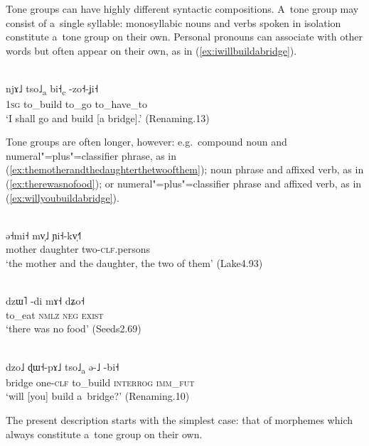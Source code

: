 Tone groups can have highly different syntactic compositions. A~tone group may consist of a~single syllable: monosyllabic nouns and verbs spoken in isolation constitute a~tone group on their own. Personal pronouns can associate with other words but often appear on their own, as in (\ref{ex:iwillbuildabridge}).

\begin{exe}
	\ex
	\label{ex:iwillbuildabridge}
	\\
	\gll njɤ˩	tso˩\textsubscript{a}	bi˧\textsubscript{c}		-zo˧-ʝi˧\\
	1\textsc{sg}	to\_build	to\_go	to\_have\_to\\
	\glt ‘I shall go and build [a bridge].’ (Renaming.13)
\end{exe}

Tone groups are often longer, however: e.g.~compound noun and numeral"=plus"=classifier phrase, as in (\ref{ex:themotherandthedaughterthetwoofthem}); noun phrase and affixed verb, as in (\ref{ex:therewasnofood}); or numeral"=plus"=classifier phrase and affixed verb, as in (\ref{ex:willyoubuildabridge}).
\begin{exe}
  \ex
  \label{ex:themotherandthedaughterthetwoofthem}
  \\
  \gll ə˧mi˧	mv̩˩ 		ɲi˧-kv̩˧˥\\
  mother	daughter	two-\textsc{clf}.persons\\
  \glt ‘the mother and the daughter, the two of them’ (Lake4.93)

  \ex
  \label{ex:therewasnofood}
  \\
  \gll dzɯ˥	-di	mɤ˧	dʑo˧\\
  to\_eat	\textsc{nmlz}	\textsc{neg}	\textsc{exist}\\
  \glt ‘there was no food’ (Seeds2.69)

  \ex
  \label{ex:willyoubuildabridge}
  \\
  \gll dzo˩	ɖɯ˧-pɤ˩	tso˩\textsubscript{a} 		ə-˩		-bi˧\\
  bridge	one-\textsc{clf}		to\_build		\textsc{interrog}	\textsc{imm\_fut}\\
  \glt ‘will [you] build a~bridge?’ (Renaming.10)
\end{exe}

The present description starts with the simplest case: that of morphemes which always constitute
a~tone group on their own.


